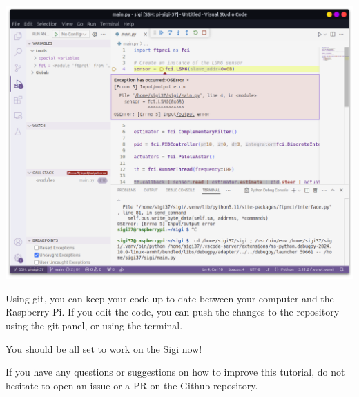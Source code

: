 \documentclass{article}
\begin{document}
\includegraphics[scale=0.3]{img/vsc_debug.png}

Using git, you can keep your code up to date between your computer and the Raspberry Pi.
If you edit the code, you can push the changes to the repository using the git panel, or using the
terminal.

You should be all set to work on the Sigi now!

If you have any questions or suggestions on how to improve this tutorial, do not hesitate to open
an issue or a PR on the Github repository.
\end{document}
